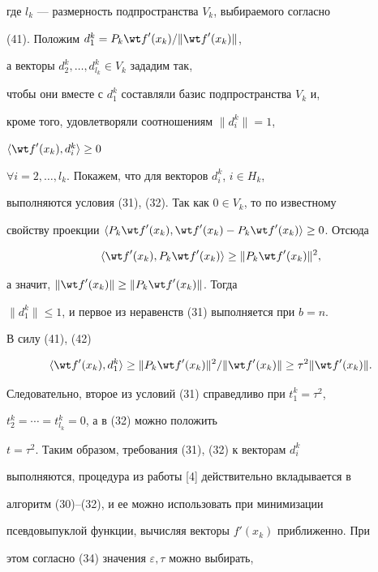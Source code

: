 где $l_k$ --- размерность подпространства $V_k$, выбираемого согласно


(41). Положим $d_1^k=P_k{\wt f}'(x_k)/\|{{\wt f}'(x_k)}\|$,


а векторы $d_2^k,\dotsc,d_{l_k}^k\in V_k$ зададим так,


чтобы они вместе с $d_1^k$ составляли базис подпространства $V_k$ и,


кроме того, удовлетворяли соотношениям $\|{d_i^k}\|=1$,


$\langle {{\wt f}'(x_k),d_i^k}\rangle\ge 0$


$\forall i=2,\dotsc,l_k$. Покажем, что для векторов $d_i^k$, $i\in H_k$,


выполняются условия (31), (32). Так как $0\in V_k$, то по известному


свойству проекции $\langle {P_k{\wt f}'(x_k), {\wt


f}'(x_k)-P_k{\wt f}'(x_k)}\rangle\ge 0$. Отсюда


\begin{equation}


\langle {{\wt f}'(x_k),P_k{\wt f}'(x_k)}\rangle\ge\|{P_k{\wt f}'(x_k)}\|^2,


\end{equation}


а значит, $\|{{\wt f}'(x_k)}\|\ge\|{P_k{\wt f}'(x_k)}\|$. Тогда


$\|{d_1^k}\|\le 1$, и первое из неравенств (31) выполняется при $b=n$.


В силу (41), (42)


$$


\langle {{\wt f}'(x_k),d_1^k}\rangle


\ge\|{P_k{\wt f}'(x_k)}\|^2/\|{{\wt f}'(x_k)}\|


\ge\tau^2\|{{\wt f}'(x_k)}\|.


$$


Следовательно, второе из условий (31) справедливо при $t_1^k=\tau^2$,


$t_2^k=\dotsb=t_{l_k}^k=0$, а в (32) можно положить


$t=\tau^2$. Таким образом, требования (31), (32) к векторам $d_i^k$


выполняются, процедура из работы [4] действительно вкладывается в


алгоритм (30)--(32), и ее можно использовать при минимизации


псевдовыпуклой функции, вычисляя векторы ${f}'(x_k)$ приближенно. При


этом согласно (34) значения $\varepsilon,\tau $ можно выбирать,


